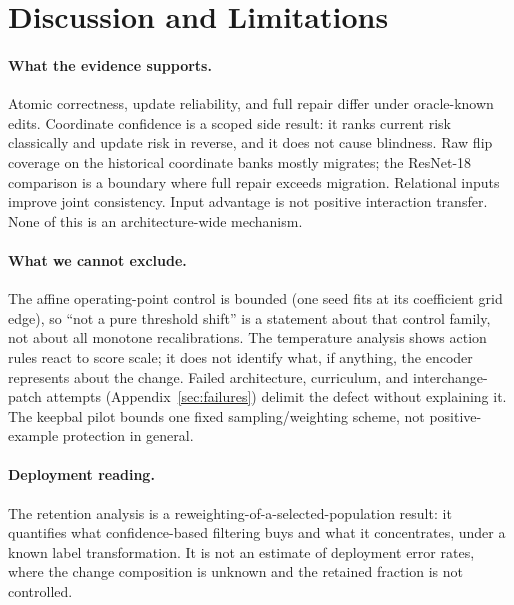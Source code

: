 \section{Discussion and Limitations}
\label{sec:limits}
\label{sec:discussion}

\paragraph{What the evidence supports.}
Atomic correctness, update reliability, and full repair differ under
oracle-known edits. Coordinate confidence is a scoped side result: it ranks
current risk classically and update risk in reverse, and it does not cause
blindness. Raw flip coverage on the historical coordinate banks mostly
migrates; the ResNet-18 comparison is a boundary where full repair exceeds
migration. Relational inputs improve joint consistency. Input advantage is
not positive interaction transfer. None of this is an architecture-wide
mechanism.

\paragraph{What we cannot exclude.} The affine operating-point control is
bounded (one seed fits at its coefficient grid edge), so ``not a pure
threshold shift'' is a statement about that control family, not about all
monotone recalibrations. The temperature analysis shows action rules react
to score scale; it does not identify what, if anything, the encoder
represents about the change. Failed architecture, curriculum, and
interchange-patch attempts (Appendix~\ref{sec:failures}) delimit the
defect without explaining it. The keepbal pilot bounds one fixed
sampling/weighting scheme, not positive-example protection in general.

\paragraph{Deployment reading.} The retention analysis is a
reweighting-of-a-selected-population result: it quantifies what
confidence-based filtering buys and what it concentrates, under a known
label transformation. It is not an estimate of deployment error rates,
where the change composition is unknown and the retained fraction is not
controlled.

